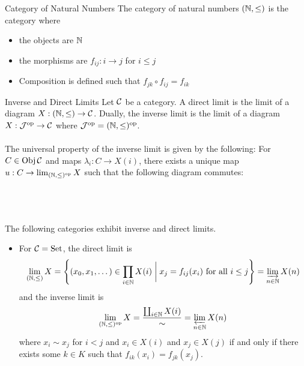 \documentclass[a4paper]{article}
\begin{document}
\begin{defn}{Category of Natural Numbers}{} The category of natural numbers $(\mathbb{N},\leq)$ is the category where 
\begin{itemize}
\item the objects are $\mathbb{N}$
\item the morphisms are $f_{ij}:i\to j$ for $i\leq j$
\item Composition is defined such that $f_{jk}\circ f_{ij}=f_{ik}$
\end{itemize}
\end{defn}

\begin{defn}{Inverse and Direct Limits}{} Let $\mathcal{C}$ be a category. A direct limit is the limit of a diagram $X:(\mathbb{N},\leq)\to\mathcal{C}$. Dually, the inverse limit is the limit of a diagram $X:\mathcal{J}^{\text{op}}\to\mathcal{C}$ where $\mathcal{J}^{\text{op}}=(\mathbb{N},\leq)^{\text{op}}$. \\~\\

The universal property of the inverse limit is given by the following: For $C\in\operatorname{Obj}\mathcal{C}$ and maps $\lambda_i:C\to X(i)$, there exists a unique map $u:C\to\lim_{(\mathbb{N},\leq)^{\text{op}}}X$ such that the following diagram commutes: \\~\\
\\~\\
\end{defn}

\begin{prp}{}{} The following categories exhibit inverse and direct limits. 
\begin{itemize}
\item For $\mathcal{C}=\text{Set}$, the direct limit is $$\lim_{(\mathbb{N},\leq)}X=\left\{(x_0,x_1,\dots)\in\prod_{i\in \mathbb{N}}X(i)\;\bigg{|}\;x_j=f_{ij}(x_i)\text{ for all }i\leq j\right\}=\varinjlim_{n\in\mathbb{N}}X(n)$$ and the inverse limit is $$\lim_{(\mathbb{N},\leq)^\text{op}}X=\frac{\coprod_{i\in\mathbb{N}}X(i)}{\sim}=\varprojlim_{n\in\mathbb{N}}X(n)$$ where $x_i\sim x_j$ for $i<j$ and $x_i\in X(i)$ and $x_j\in X(j)$ if and only if there exists some $k\in K$ such that $f_{ik}(x_i)=f_{jk}(x_j)$. 
\end{itemize}
\end{prp}
\end{document}
